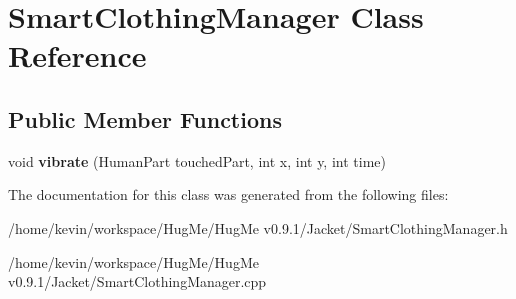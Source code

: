 \hypertarget{classSmartClothingManager}{
\section{SmartClothingManager Class Reference}
\label{classSmartClothingManager}
}
\subsection*{Public Member Functions}
\begin{DoxyCompactItemize}
\item 
\hypertarget{classSmartClothingManager_a523c8a28beef2d207104624a0a9ca79f}{
void {\bfseries vibrate} (HumanPart touchedPart, int x, int y, int time)}
\label{classSmartClothingManager_a523c8a28beef2d207104624a0a9ca79f}

\end{DoxyCompactItemize}


The documentation for this class was generated from the following files:\begin{DoxyCompactItemize}
\item 
/home/kevin/workspace/HugMe/HugMe v0.9.1/Jacket/SmartClothingManager.h\item 
/home/kevin/workspace/HugMe/HugMe v0.9.1/Jacket/SmartClothingManager.cpp\end{DoxyCompactItemize}

